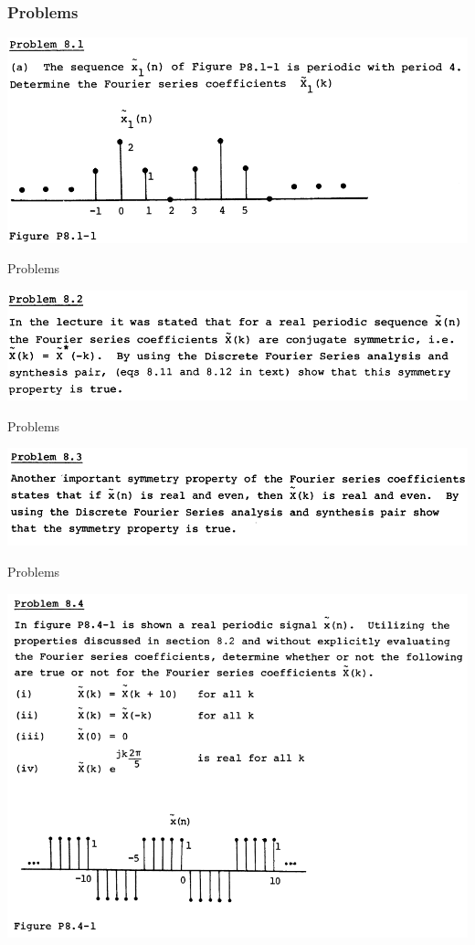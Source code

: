 \documentclass[pdflatex,compress,mathserif]{beamer}
\begin{document}
\begin{frame}
	\frametitle{Problems}
	\begin{center}
		\includegraphics[width=\linewidth]{img/img05}
	\end{center}
\end{frame}

\begin{frame}{Problems}
	\begin{center}
		\includegraphics[width=\linewidth]{img/img06}
	\end{center}
\end{frame}

\begin{frame}{Problems}
	\begin{center}
		\includegraphics[width=\linewidth]{img/img07}
	\end{center}
\end{frame}

\begin{frame}{Problems}
	\begin{center}
		\includegraphics[width=0.9\linewidth]{img/img08}
	\end{center}
\end{frame}
\end{document}
